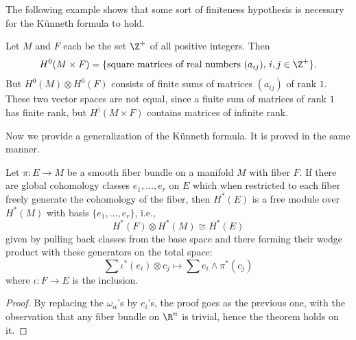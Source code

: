 The following example shows that some sort of finiteness hypothesis is necessary for the K\"unneth formula to hold.
\begin{example}
Let $M$ and $F$ each be the set $\Z^+$ of all positive integers. Then
\[H^0(M\times F)=\{\text{square matrices of real numbers $(a_{ij})$, $i,j\in\Z^+$}\}.\]
But $H^0(M)\otimes H^0(F)$ consists of finite sums of matrices $(a_{ij})$ of rank $1$. These two vector spaces are not equal, since a finite sum of matrices of rank $1$ 
has finite rank, but $H^)(M\times F)$ contains matrices of infinite rank.
\end{example}
Now we provide a generalization of the K\"unneth formula. It is proved in the same manner.
\begin{theorem}
Let $\pi:E\to M$ be a smooth fiber bundle on a manifold $M$ with fiber $F$. If there are global cohomology classes $e_1,\dots,e_r$ on $E$ which when restricted to each fiber 
freely generate the cohomology of the fiber, then $H^*(E)$ is a free module over $H^*(M)$ with basis $\{e_1,\dots,e_r\}$, i.e.,
\[H^*(F)\otimes H^*(M) \cong H^*(E)\]
given by pulling back classes from the base space and there forming their wedge product with these generators on the total space:
\[\sum \iota^*(e_i)\otimes c_j\mapsto\sum e_i\wedge \pi^*(c_j)\]
where $\iota:F\to E$ is the inclusion.
\end{theorem}
\begin{proof}
By replacing the $\omega_\alpha$'s by $e_i$'s, the proof goes as the previous one, with the observation that any fiber bundle on $\R^n$ is trivial, hence the theorem holds 
on it.
\end{proof}

